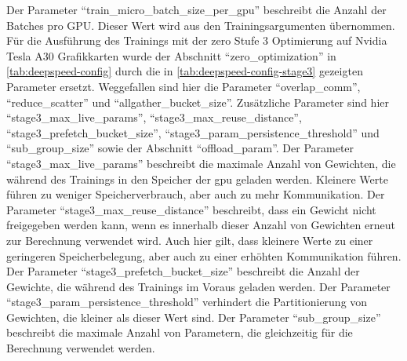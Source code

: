 Der Parameter \enquote{train\_micro\_batch\_size\_per\_gpu} beschreibt die Anzahl der Batches pro GPU.
Dieser Wert wird aus den Trainingsargumenten übernommen.\\

Für die Ausführung des Trainings mit der \ac{zero} Stufe 3 Optimierung auf Nvidia Tesla A30 Grafikkarten wurde der Abschnitt \enquote{zero\_optimization} in \cref{tab:deepspeed-config} durch die in \cref{tab:deepspeed-config-stage3} gezeigten Parameter ersetzt. Weggefallen sind hier die Parameter \enquote{overlap\_comm}, \enquote{reduce\_scatter} und \enquote{allgather\_bucket\_size}.
Zusätzliche Parameter sind hier \enquote{stage3\_max\_live\_params}, \enquote{stage3\_max\_reuse\_distance}, \enquote{stage3\_prefetch\_bucket\_size}, \enquote{stage3\_param\_persistence\_threshold} und \enquote{sub\_group\_size} sowie der Abschnitt \enquote{offload\_param}.
Der Parameter \enquote{stage3\_max\_live\_params} beschreibt die maximale Anzahl von Gewichten, die während des Trainings in den Speicher der \ac{gpu} geladen werden. Kleinere Werte führen zu weniger Speicherverbrauch, aber auch zu mehr Kommunikation.
Der Parameter \enquote{stage3\_max\_reuse\_distance} beschreibt, dass ein Gewicht nicht freigegeben werden kann, wenn es innerhalb dieser Anzahl von Gewichten erneut zur Berechnung verwendet wird. Auch hier gilt, dass kleinere Werte zu einer geringeren Speicherbelegung, aber auch zu einer erhöhten Kommunikation führen.
Der Parameter \enquote{stage3\_prefetch\_bucket\_size} beschreibt die Anzahl der Gewichte, die während des Trainings im Voraus geladen werden.
Der Parameter \enquote{stage3\_param\_persistence\_threshold} verhindert die Partitionierung von Gewichten, die kleiner als dieser Wert sind.
Der Parameter \enquote{sub\_group\_size} beschreibt die maximale Anzahl von Parametern, die gleichzeitig für die Berechnung verwendet werden.

